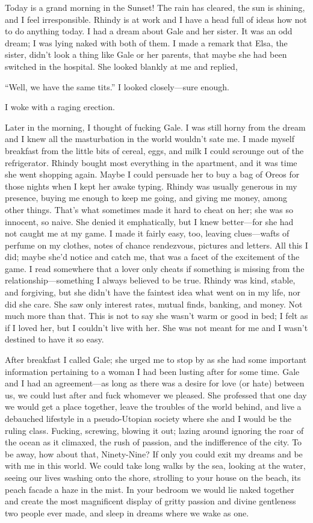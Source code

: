 Today is a grand morning in the Sunset! The rain has cleared, the sun is
shining, and I feel irresponsible. Rhindy is at work and I have a head
full of ideas how not to do anything today. I had a dream about Gale and
her sister. It was an odd dream; I was lying naked with both of them. I
made a remark that Elsa, the sister, didn't look a thing like Gale or
her parents, that maybe she had been switched in the hospital. She
looked blankly at me and replied,

``Well, we have the same tits.'' I looked closely---sure enough.

I woke with a raging erection.

Later in the morning, I thought of fucking Gale. I was still horny from
the dream and I knew all the masturbation in the world wouldn't sate me.
I made myself breakfast from the little bits of cereal, eggs, and milk I
could scrounge out of the refrigerator. Rhindy bought most everything in
the apartment, and it was time she went shopping again. Maybe I could
persuade her to buy a bag of Oreos for those nights when I kept her
awake typing. Rhindy was usually generous in my presence, buying me
enough to keep me going, and giving me money, among other things. That's
what sometimes made it hard to cheat on her; she was so innocent, so
naive. She denied it emphatically, but I knew better---for she had not
caught me at my game. I made it fairly easy, too, leaving clues---wafts
of perfume on my clothes, notes of chance rendezvous, pictures and
letters. All this I did; maybe she'd notice and catch me, that was a
facet of the excitement of the game. I read somewhere that a lover only
cheats if something is missing from the relationship---something I
always believed to be true. Rhindy was kind, stable, and forgiving, but
she didn't have the faintest idea what went on in my life, nor did she
care. She saw only interest rates, mutual finds, banking, and money. Not
much more than that. This is not to say she wasn't warm or good in bed;
I felt as if I loved her, but I couldn't live with her. She was not
meant for me and I wasn't destined to have it so easy.

After breakfast I called Gale; she urged me to stop by as she had some
important information pertaining to a woman I had been lusting after for
some time. Gale and I had an agreement---as long as there was a desire
for love (or hate) between us, we could lust after and fuck whomever we
pleased. She professed that one day we would get a place together, leave
the troubles of the world behind, and live a debauched lifestyle in a
pseudo-Utopian society where she and I would be the ruling class.
Fucking, screwing, blowing it out; lazing around ignoring the roar of
the ocean as it climaxed, the rush of passion, and the indifference of
the city. To be away, how about that, Ninety-Nine? If only you could
exit my dreams and be with me in this world. We could take long walks by
the sea, looking at the water, seeing our lives washing onto the shore,
strolling to your house on the beach, its peach facade a haze in the
mist. In your bedroom we would lie naked together and create the most
magnificent display of gritty passion and divine gentleness two people
ever made, and sleep in dreams where we wake as one.

